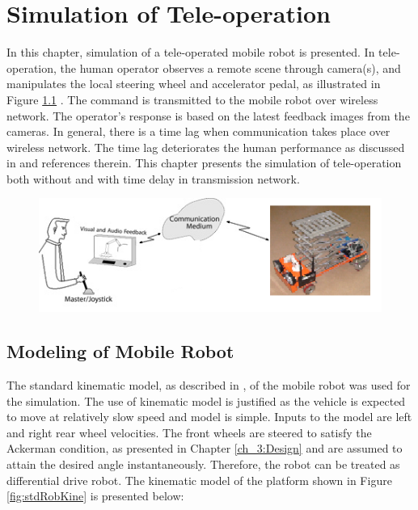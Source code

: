 
\chapter{Simulation of Tele-operation}
\label{c6_simulation}
In this chapter, simulation of a tele-operated mobile robot is presented. In tele-operation, the human operator observes a remote scene through camera(s), and manipulates the local steering wheel and accelerator pedal, as illustrated in Figure \ref{fig:teleoperation} . The command is transmitted to the mobile robot over wireless network. The operator's response is based on the latest feedback images from the cameras. In general, there is a time lag when communication takes place over wireless network. The time lag deteriorates the human performance as discussed in \cite{chen2007human} and references therein.  This chapter presents the simulation of tele-operation both without and with time delay in transmission network.
\begin{figure}
	\includegraphics[width=\linewidth,keepaspectratio]{Chapter6/fig/teleoperation}
	\label{fig:teleoperation} 
\end{figure}

\section{Modeling of Mobile Robot}

The standard kinematic model, as described in \cite{campion1996structural}, of the mobile robot was used for the simulation. The use of kinematic model is justified as  the vehicle is expected to move at relatively slow speed and model is simple. Inputs to the model are left and right rear wheel velocities. The front wheels are steered to satisfy the Ackerman condition, as presented in Chapter \ref{ch_3:Design}  and are assumed to attain the desired angle instantaneously. Therefore, the robot can be treated as differential drive robot.  The kinematic model of the platform shown in Figure \ref{fig:stdRobKine} is presented below:


